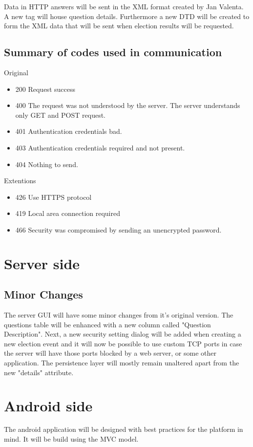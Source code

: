 \documentclass[11pt,twoside,a4paper]{book}
\begin{document}
Data in HTTP answers will be sent in the XML format created by Jan Valenta. A new tag will house question details. Furthermore a new DTD will be created to form the XML data that will be sent when election results will be requested.

\subsection{Summary of codes used in communication}
Original\cite{bakalarkaJV}
\begin{itemize}
\item 200 Request success
\item 400 The request was not understood by the server. The server understands only GET and POST request.
\item 401 Authentication credentials bad.
\item 403 Authentication credentials required and not present.
\item 404 Nothing to send.\\
\end{itemize}

Extentions
\begin{itemize}
\item 426 Use HTTPS protocol
\item 419 Local area connection required
\item 466 Security was compromised by sending an unencrypted password.
\end{itemize}
\section{Server side}
\subsection{Minor Changes}
The server GUI will have some minor changes from it's original version. The questions table will be enhanced with a new column called "Question Description". Next, a new security setting dialog will be added when creating a new election event and it will now be possible to use custom TCP ports in case the server will  have those ports blocked by a web server, or some other application. The persistence layer will mostly remain unaltered apart from the new "details" attribute.


\section{Android side}
The android application will be designed with best practices for the platform in mind. It will be build using the MVC model\cite{whatIsMVC}.
\end{document}
